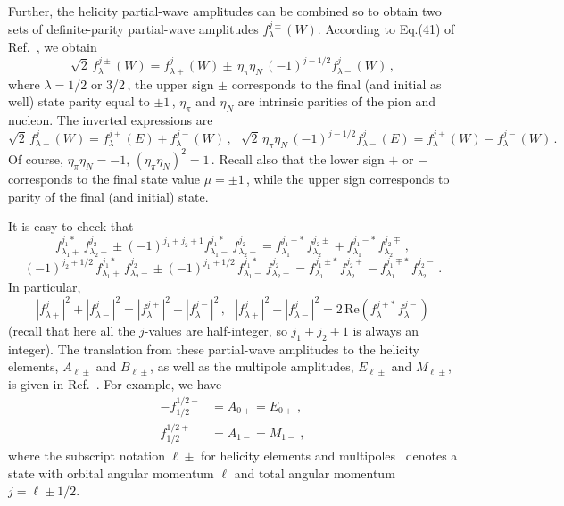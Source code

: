 \documentclass[prc,reprint,onecolumn,amsmath,amssymb,superscriptaddress]{revtex4-1}
\newcommand{\be}{\begin{equation}}
\newcommand{\ee}{\end{equation}}
\begin{document}
Further, the helicity partial-wave amplitudes can be combined so to obtain two 
sets of definite-parity partial-wave amplitudes $f_{\lambda}^{j\pm}(W)$. 
According to Eq.(41) of Ref.~\cite{jw}, we obtain
\be
	\sqrt{2}\,f_{\lambda}^{j\pm}(W)=f^j_{\lambda+}(W)\pm\,\eta_\pi 
	\eta_N\,(-1)^{j-1/2} f^j_{\lambda-}(W)\,,
\ee
where $\lambda=1/2$ or 3/2\,, the upper sign $\pm$ corresponds to the final 
(and initial as well) state parity equal to $\pm1\,$, $\eta_\pi$ and $\eta_N$ 
are intrinsic parities of the pion and nucleon. The inverted expressions are
\be
	\sqrt{2}\,f_{\lambda+}^j(W)=f^{j+}_{\lambda}(E)+f^{j-}_{\lambda}(W)\,,~~~
	\sqrt{2}\,\eta_\pi \eta_N\,(-1)^{j-1/2}f^j_{\lambda-}(E)=f^{j+}_{\lambda}(W)-
	f^{j-}_{\lambda}(W)\,.
\ee
Of course, $\eta_\pi \eta_N=-1,\,(\eta_\pi \eta_N)^2=1\,$. Recall also that
the lower sign $+$ or $-$ corresponds to the final state value $\mu=\pm1\,$,
while the upper sign corresponds to parity of the final (and initial) state.

It is easy to check that
\be
	f_{\lambda_1+}^{j_1*}\,f_{\lambda_2+}^{j_2}\pm
	(-1)^{j_1+j_2+1}f_{\lambda_1-}^{j_1*}\,f_{\lambda_2-}^{j_2}=
	f_{\lambda_1}^{j_1+*}\,f_{\lambda_2}^{j_2\pm}+
	f_{\lambda_1}^{j_1-*}\,f_{\lambda_2}^{j_2\mp}\,,
\ee
\be
	(-1)^{j_2+1/2}\,f_{\lambda_1+}^{j_1*}\,f_{\lambda_2-}^{j_2}\pm
	(-1)^{j_1+1/2}\,f_{\lambda_1-}^{j_1*}\,f_{\lambda_2+}^{j_2}=
	f_{\lambda_1}^{j_1\pm*}\,f_{\lambda_2}^{j_2+}-
	f_{\lambda_1}^{j_1\mp*}\,f_{\lambda_2}^{j_2-}\,.
\ee
In particular,
$$
	|f^j_{\lambda+}|^2+|f^j_{\lambda-}|^2=|f_{\lambda}^{j+}|^2+
	|f_{\lambda}^{j-}|^2\,,~~~
	|f^j_{\lambda+}|^2-|f^j_{\lambda-}|^2=2\,\mathrm{Re}(f_{\lambda}^{j+*}\,
	f_{\lambda}^{j-})
$$
(recall that here all the $j$-values are half-integer, so $j_1+j_2+1$ is always 
an integer).
The translation from these partial-wave amplitudes to the helicity elements, 
$A_{\ell \pm}$ and $B_{\ell \pm}$,
as well as the multipole amplitudes, $E_{\ell \pm}$ and $M_{\ell \pm}$, 
is given in Ref.~\cite{Walker}. For
example, we have
\begin{align}
-f_{1/2}^{1/2-} &=  A_{0+} = E_{0+}~, \\
f_{1/2}^{1/2+} &=   A_{1-} = M_{1-}~,
\end{align}
where the subscript notation $\ell \pm$ for helicity elements and 
multipoles~\cite{CGLN} denotes a state with orbital 
angular momentum $\ell$ and total angular momentum $j=\ell \pm 1/2$. 
\end{document}
